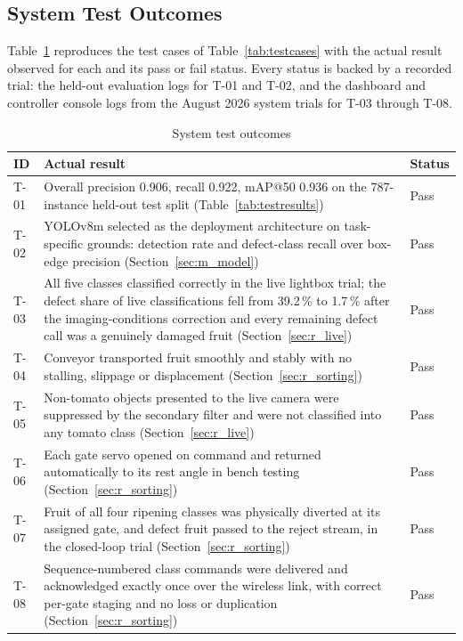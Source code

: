 \subsection{System Test Outcomes}
\label{sec:r_tests}

Table~\ref{tab:testoutcomes} reproduces the test cases of Table~\ref{tab:testcases} with the actual result observed for each and its pass or fail status. Every status is backed by a recorded trial: the held-out evaluation logs for T-01 and T-02, and the dashboard and controller console logs from the August 2026 system trials for T-03 through T-08.

\begin{table}[H]
\caption{System test outcomes}
\label{tab:testoutcomes}
\centering
\begin{tabularx}{\textwidth}{l X l}
\toprule
\textbf{ID} & \textbf{Actual result} & \textbf{Status} \\
\midrule
T-01 & Overall precision 0.906, recall 0.922, mAP@50 0.936 on the 787-instance held-out test split (Table~\ref{tab:testresults}) & Pass \\
T-02 & YOLOv8m selected as the deployment architecture on task-specific grounds: detection rate and defect-class recall over box-edge precision (Section~\ref{sec:m_model}) & Pass \\
T-03 & All five classes classified correctly in the live lightbox trial; the defect share of live classifications fell from 39.2\,\% to 1.7\,\% after the imaging-conditions correction and every remaining defect call was a genuinely damaged fruit (Section~\ref{sec:r_live}) & Pass \\
T-04 & Conveyor transported fruit smoothly and stably with no stalling, slippage or displacement (Section~\ref{sec:r_sorting}) & Pass \\
T-05 & Non-tomato objects presented to the live camera were suppressed by the secondary filter and were not classified into any tomato class (Section~\ref{sec:r_live}) & Pass \\
T-06 & Each gate servo opened on command and returned automatically to its rest angle in bench testing (Section~\ref{sec:r_sorting}) & Pass \\
T-07 & Fruit of all four ripening classes was physically diverted at its assigned gate, and defect fruit passed to the reject stream, in the closed-loop trial (Section~\ref{sec:r_sorting}) & Pass \\
T-08 & Sequence-numbered class commands were delivered and acknowledged exactly once over the wireless link, with correct per-gate staging and no loss or duplication (Section~\ref{sec:r_sorting}) & Pass \\
\bottomrule
\end{tabularx}
\end{table}

